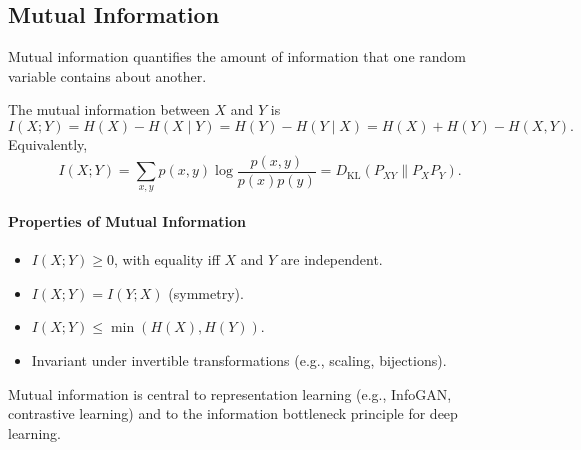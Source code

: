 \documentclass{tufte-handout}
\begin{document}
\subsection{Mutual Information}

Mutual information quantifies the amount of information that one random variable contains about another.

\begin{defn}
    The mutual information between $X$ and $Y$ is
    \[
    I(X;Y) = H(X) - H(X \mid Y) = H(Y) - H(Y \mid X) = H(X) + H(Y) - H(X,Y).
    \]
    Equivalently,
    \[
    I(X;Y) = \sum_{x,y} p(x,y) \log \frac{p(x,y)}{p(x)p(y)} = D_{\text{KL}}(P_{XY} \parallel P_X P_Y).
    \]
\end{defn}

\begin{marginfigure}
\centering
{}
\caption{Venn diagram interpretation: mutual information is the intersection of information content.}
\end{marginfigure}

\paragraph{Properties of Mutual Information}
\begin{itemize}
    \item $I(X;Y) \ge 0$, with equality iff $X$ and $Y$ are independent.
    \item $I(X;Y) = I(Y;X)$ (symmetry).
    \item $I(X;Y) \le \min(H(X), H(Y))$.
    \item Invariant under invertible transformations (e.g., scaling, bijections).
\end{itemize}

Mutual information is central to representation learning (e.g., InfoGAN, contrastive learning) and to the information bottleneck principle for deep learning.
\end{document}

